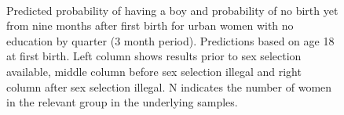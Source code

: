 \documentclass[12pt,letterpaper]{article}
\begin{document}
\begin{figure}[h]
{\begin{minipage}{0.26\textwidth}
        \captionsetup[subfigure]{labelformat=empty,position=top,captionskip=-1pt,farskip=-0.5pt}
        \\
        \captionsetup[subfigure]{labelformat=parens}
    \end{minipage}
}
\setcounter{subfigure}{3}
\caption{Predicted probability of having a boy and probability of
no birth yet from nine months after first birth for urban 
women with no education by quarter (3 month period). 
Predictions based on age 18 at first birth.
Left column shows results prior to sex selection available, middle column before
sex selection illegal and right column after sex selection illegal.
N indicates the number of women in the relevant group in the underlying samples.
}
\label{fig:results_spell2_low_urban}
\end{figure}
\end{document}
